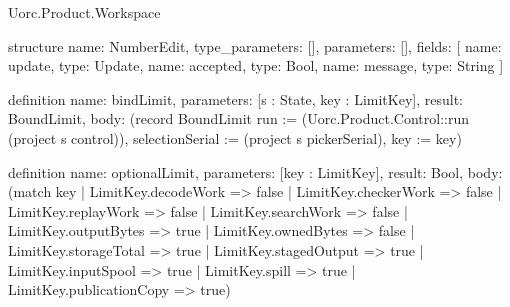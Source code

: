 \begin{lexlean}{Uorc.Product.Workspace}
\begin{semanticmodule}
structure{
  name: NumberEdit,
  type_parameters: [],
  parameters: [],
  fields: [
    {name: update, type: Update},
    {name: accepted, type: Bool},
    {name: message, type: String}
  ]
}

definition{
  name: bindLimit,
  parameters: [s : State, key : LimitKey],
  result: BoundLimit,
  body: (record BoundLimit {run := (Uorc.Product.Control::run (project s control)), selectionSerial := (project s pickerSerial), key := key})
}

definition{
  name: optionalLimit,
  parameters: [key : LimitKey],
  result: Bool,
  body: (match key
    | LimitKey.decodeWork => false
    | LimitKey.checkerWork => false
    | LimitKey.replayWork => false
    | LimitKey.searchWork => false
    | LimitKey.outputBytes => true
    | LimitKey.ownedBytes => false
    | LimitKey.storageTotal => true
    | LimitKey.stagedOutput => true
    | LimitKey.inputSpool => true
    | LimitKey.spill => true
    | LimitKey.publicationCopy => true)
}


\end{semanticmodule}
\end{lexlean}
